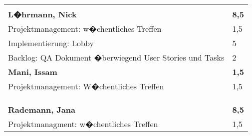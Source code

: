 \documentclass[a4paper,11pt]{scrartcl}
\begin{document}
\begin{longtable}{| p{13.8cm} | C{2.4cm} |}

	&

	\\
	\hline


	&

	\\
	\hline
	\hline


	\textbf{L�hrmann, Nick} & \textbf{8,5}\\ %
	\hline

	Projektmanagement: w�chentliches Treffen
	&
	1,5
	\\
	\hline

	Implementierung: Lobby
	&
  5
	\\
	\hline

  Backlog: QA Dokument �berwiegend User Stories und Tasks
	&
  2
	\\
	\hline
	\hline


	\textbf{Mani, Issam} & \textbf{1,5}\\ %
	\hline

  Projektmanagement: W�chentliches Treffen
	&
  1,5
	\\
	\hline


	&

	\\
	\hline


	&

	\\
	\hline


	&

	\\
	\hline
	\hline


	\textbf{Rademann, Jana} & \textbf{8,5}\\ %
	\hline

  Projektmanagment: w�chentliches Treffen
	&
  1,5
	\\
	\hline


\end{longtable}
\end{document}
